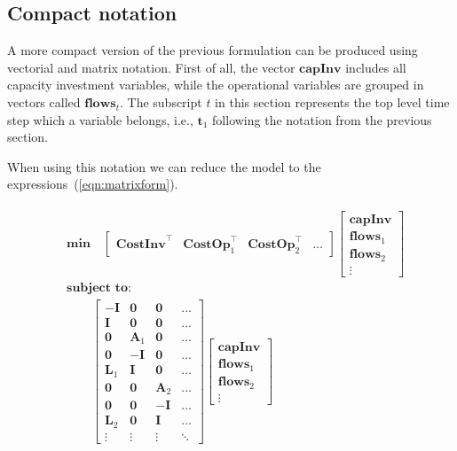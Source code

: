\documentclass{article}
\begin{document}
\subsection{Compact notation}

A more compact version of the previous formulation can be produced using vectorial and matrix notation. First of all, the vector $\textbf{capInv}$ includes all capacity investment variables, while the operational variables are grouped in vectors called $\textbf{flows}_t$. The subscript $t$ in this section represents the top level time step which a variable belongs, i.e., $\textbf{t}_1$ following the notation from the previous section.

When using this notation we can reduce the model to the expressions~(\ref{eqn:matrixform}).

\begin{align}
\begin{split}
& \textbf{min}\quad \begin{bmatrix}
 \textbf{CostInv}^\top & \textbf{CostOp}^\top_1 & \textbf{CostOp}^\top_2 & \ldots \end{bmatrix}
 \begin{bmatrix} \textbf{capInv} \\ \textbf{flows}_1 \\ \textbf{flows}_2 \\ \vdots \end{bmatrix} \\
& \textbf{subject to:} \\
& \qquad \begin{bmatrix}
 -\textbf{I} & \textbf{0} & \textbf{0} & \ldots \\
 \textbf{I} & \textbf{0} & \textbf{0} & \ldots \\
 \textbf{0} & \textbf{A}_1 & \textbf{0} & \ldots \\
 \textbf{0} & -\textbf{I} & \textbf{0} & \ldots \\
 \textbf{L}_1 & \textbf{I} & \textbf{0} & \ldots \\
 \textbf{0} & \textbf{0} & \textbf{A}_2 & \ldots \\
 \textbf{0} & \textbf{0} & -\textbf{I} & \ldots \\
 \textbf{L}_2 & \textbf{0} & \textbf{I} & \ldots \\
 \vdots & \vdots & \vdots & \ddots \end{bmatrix}
 \begin{bmatrix} \textbf{capInv} \\ \textbf{flows}_1 \\ \textbf{flows}_2 \\ \vdots \end{bmatrix}

\end{split}
\end{align}
\end{document}
